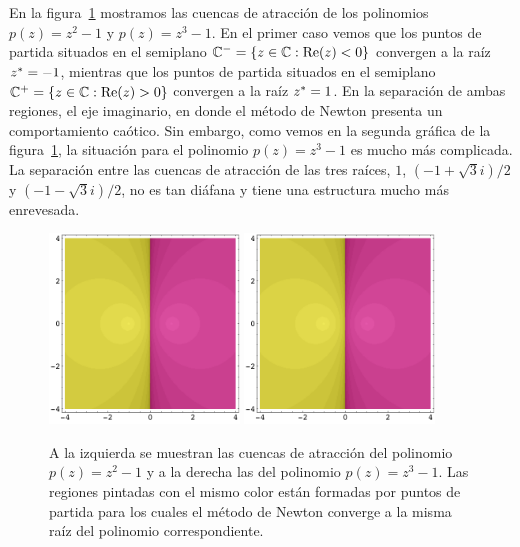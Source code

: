 En la figura~\ref{C4fig:1} mostramos las cuencas de atracción de los polinomios $p(z)=z^2-1$ y $p(z)=z^3-1$. En el primer caso vemos que los puntos de partida situados en el semiplano $\mathbb{C}^-=\{z\in \mathbb{C}: \operatorname{Re} (z)<0 \}$ convergen a la raíz $z^{\ast}=-1$, mientras que los puntos de partida situados en el semiplano $\mathbb{C}^+=\{z\in \mathbb{C}: \operatorname{Re} (z)>0 \}$ convergen a la raíz $z^{\ast}=1$. En la separación de ambas regiones, el eje imaginario, en donde el método de Newton presenta un comportamiento caótico. Sin embargo, como vemos en la segunda gráfica de la figura~\ref{C4fig:1}, la situación para el polinomio $p(z)=z^3-1$ es mucho más complicada. La separación entre las cuencas de atracción de las tres raíces, $1$, $(-1+\sqrt{3}i)/2$ y $(-1-\sqrt{3}i)/2$, no es tan diáfana y tiene una estructura mucho más enrevesada.

\begin{figure}[htb]
\centering
\includegraphics[width=0.45\textwidth]{NDfigura0.pdf}
\qquad
 \includegraphics[width=0.45\textwidth]{NDfigura0.pdf}
\caption{A la izquierda se muestran las cuencas de atracción del polinomio $p(z)=z^2-1$ y a la derecha las del polinomio $p(z)=z^3-1$. Las regiones pintadas con el mismo color están formadas por puntos de partida para los cuales el método de Newton converge a la misma raíz del polinomio correspondiente.}
 \label{C4fig:1}
\end{figure}



